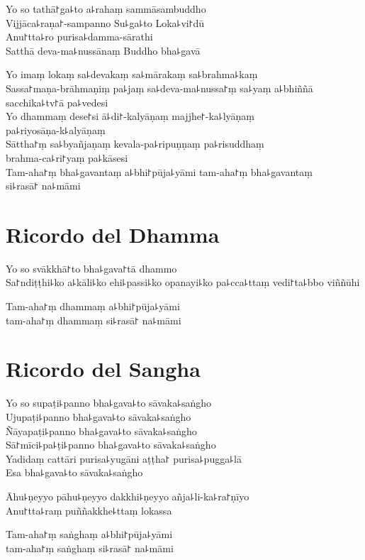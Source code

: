 Yo so tathā꜓ga꜕to a꜕rahaṃ sammāsambuddho\\
Vijjāca꜕raṇa꜓-sampanno Su꜕ga꜕to Loka꜕vi꜓dū\\
Anu꜓tta꜕ro purisa꜕damma-sārathi\\
Satthā deva-ma꜕nussānaṃ Buddho bha꜕gavā

Yo imaṃ lokaṃ sa꜕devakaṃ sa꜕mārakaṃ sa꜕brahma꜕kaṃ\\
Sassa꜓maṇa-brāhmaṇiṃ pa꜕jaṃ sa꜕deva-ma꜕nussa꜓ṃ sa꜕yaṃ a꜕bhiññā sacchika꜕tv꜓ā pa꜕vedesi\\
Yo dhammaṃ dese꜓si ā꜕di꜓-kalyāṇaṃ majjhe꜓-ka꜕lyāṇaṃ\\
pa꜕riyosāṇa-k꜕alyāṇaṃ\\
Sāttha꜓ṃ sa꜕byañjaṇaṃ kevala-pa꜕ripuṇṇaṃ pa꜕risuddhaṃ\\
brahma-ca꜕ri꜓yaṃ pa꜕kāsesi\\

Tam-aha꜓ṃ bha꜕gavantaṃ a꜕bhi꜓pūja꜕yāmi tam-aha꜓ṃ bha꜕gavantaṃ\\
si꜕rasā꜓ na꜕māmi 

\chapter{Ricordo del Dhamma}     %

\begin{leader}
\end{leader}

Yo so svākkhā꜓to bha꜕gava꜓tā dhammo\\
Sa꜓ndiṭṭhi꜕ko a꜕kāli꜕ko ehi꜕passi꜕ko opanayi꜕ko pa꜕cca꜕ttaṃ vedi꜓ta꜕bbo viññūhi

Tam-aha꜓ṃ dhammaṃ a꜕bhi꜓pūja꜕yāmi\\
\vin tam-aha꜓ṃ dhammaṃ si꜕rasā꜓ na꜕māmi 

\enlargethispage{\baselineskip}
\clearpage

\chapter{Ricordo del Sangha}     %

\begin{leader}
\end{leader}

Yo so supaṭi꜕panno bha꜕gava꜕to sāvaka꜕saṅgho\\
Ujupaṭi꜕panno bha꜕gava꜕to sāvaka꜕saṅgho\\
Ñāyapaṭi꜕panno bha꜕gava꜕to sāvaka꜕saṅgho\\
Sā꜓mīci꜕pa꜕ṭi꜕panno bha꜕gava꜕to sāvaka꜕saṅgho\\
Yadidaṃ cattāri purisa꜕yugāni aṭṭha꜓ purisa꜕pugga꜕lā\\
Esa bha꜕gava꜕to sāvaka꜕saṅgho

Āhu꜕ṇeyyo pāhu꜕ṇeyyo dakkhi꜕ṇeyyo añja꜕li-ka꜕ra꜓ṇīyo\\
Anu꜓tta꜕raṃ puññakkhe꜕ttaṃ lokassa

Tam-aha꜓ṃ saṅghaṃ a꜕bhi꜓pūja꜕yāmi\\
\vin tam-aha꜓ṃ saṅghaṃ si꜕rasā꜓ na꜕māmi 

